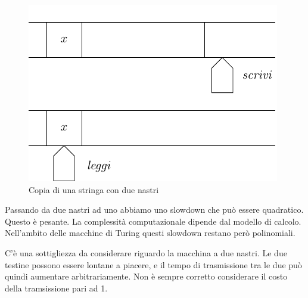 \begin{figure}[h]
    \begin{center}
        \includegraphics{img/CopyString2Tapes.pdf}
        \caption{Copia di una stringa con due nastri}
    \end{center}
\end{figure}

Passando da due nastri ad uno abbiamo uno slowdown che può essere quadratico. Questo è pesante. La
complessità computazionale dipende dal modello di calcolo. Nell'ambito delle macchine di Turing
questi slowdown restano però polinomiali.

C'è una sottigliezza da considerare riguardo la macchina a due nastri. Le due testine possono
essere lontane a piacere, e il tempo di trasmissione tra le due può quindi aumentare
arbitrariamente. Non è sempre corretto considerare il costo della tramsissione pari ad 1.
